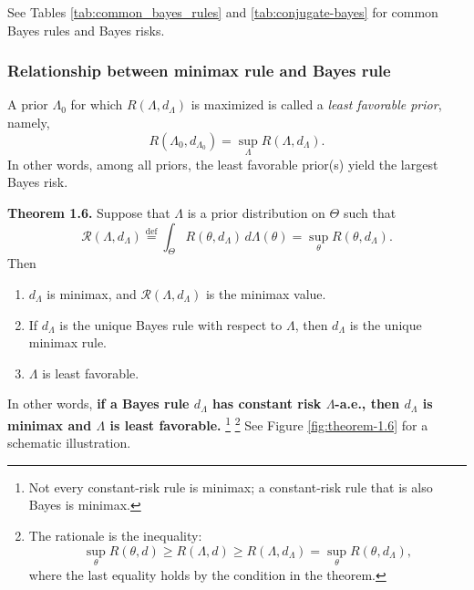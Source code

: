
See Tables \ref{tab:common_bayes_rules} and \ref{tab:conjugate-bayes} for common Bayes rules and Bayes risks.


\subsubsection{Relationship between minimax rule and Bayes rule}
A prior $\Lambda_0$ for which $R(\Lambda, d_\Lambda)$ is maximized is called a \emph{least favorable prior}, namely,
\[
R(\Lambda_0, d_{\Lambda_0}) = \sup_\Lambda R(\Lambda, d_\Lambda).
\]
In other words, among all priors, the least favorable prior(s) yield the largest Bayes risk.


\textbf{Theorem 1.6.}
Suppose that $\Lambda$ is a prior distribution on $\Theta$ such that
\[
\mathcal{R}(\Lambda, d_\Lambda)
\stackrel{\text{def}}{=} \int_{\Theta} R(\theta, d_\Lambda)\, d\Lambda(\theta)
= \sup_{\theta} R(\theta, d_\Lambda).
\]
Then
\begin{enumerate}
    \item[(i)] $d_\Lambda$ is minimax, and $\mathcal{R}(\Lambda, d_\Lambda)$ is the minimax value.
    \item[(ii)] If $d_\Lambda$ is the unique Bayes rule with respect to $\Lambda$, then $d_\Lambda$ is the unique minimax rule.
    \item[(iii)] $\Lambda$ is least favorable.
\end{enumerate}

In other words, \textbf{if a Bayes rule $d_\Lambda$ has constant risk $\Lambda$-a.e., then $d_\Lambda$ is minimax and $\Lambda$ is least favorable.} 
\footnote{Not every constant-risk rule is minimax; a constant-risk rule that is also Bayes is minimax.}
\footnote{The rationale is the inequality:
    \[
    \sup_\theta R(\theta,d)
    \geq
    R(\Lambda,d)
    \geq
    R(\Lambda,d_\Lambda)
    =
    \sup_\theta R(\theta,d_\Lambda),
    \]
    where the last equality holds by the condition in the theorem.}
See Figure \ref{fig:theorem-1.6} for a schematic illustration.
    

